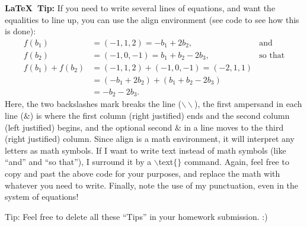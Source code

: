 \documentclass[11pt, reqno]{amsart}
\theoremstyle{plain}
\theoremstyle{definition}
\theoremstyle{example}
\newcommand{\NOTE}[1]{{\color{blue}#1}}
\begin{document}
\NOTE{\textbf{\LaTeX\ Tip:} If you need to write several lines of equations, and want the equalities to line up, you can use the align environment (see code to see how this is done):
\begin{align*}
f(b_1) &= (-1, 1, 2) = -b_1 + 2b_2, & \text{and}\\
f(b_2) &= (-1, 0, -1) = b_1 + b_2 - 2b_3, & \text{so that}\\
f(b_1) + f(b_2)
	&= (-1, 1, 2) + (-1, 0, -1)  = (-2, 1, 1)\\
	&= (-b_1 + 2b_2) + (b_1 + b_2 - 2b_3)\\
	&= -b_2 - 2b_3.
\end{align*}
Here, the two backslashes mark breaks the line ($\backslash\backslash$), the first ampersand in each line ($\&$)  is where the first column (right justified) ends and the second column (left justified) begins, and the optional second $\&$ in a line moves to the third (right justified) column. Since align is a math environment, it will interpret any letters as math symbols. If I want to write text instead of math symbols (like ``and'' and ``so that''), I surround it by a $\backslash$text$\{\}$ command. Again, feel free to copy and past the above code for your purposes, and replace the math with whatever you need to write. Finally, note the use of my punctuation, even in the system of equations!
}

\smallskip

\NOTE{Tip: Feel free to delete all these ``Tips'' in your homework submission. :)}
\end{document}
